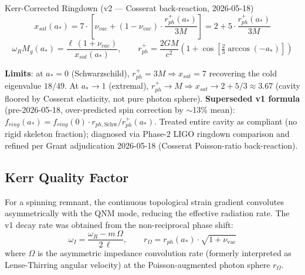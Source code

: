 \begin{resultbox}{Kerr-Corrected Ringdown (v2 --- Cosserat back-reaction, 2026-05-18)}
\begin{equation}
    x_{sat}(a_*) = 7 \cdot \left[\nu_{vac} + (1 - \nu_{vac}) \cdot \frac{r_{ph}^+(a_*)}{3M}\right] = 2 + 5 \cdot \frac{r_{ph}^+(a_*)}{3M}
\end{equation}
\begin{equation}
    \omega_R M_g(a_*) = \frac{\ell\,(1 + \nu_{vac})}{x_{sat}(a_*)}, \qquad
    r_{ph}^+ = \frac{2GM}{c^2}\left(1 + \cos\!\left[\tfrac{2}{3}\arccos(-a_*)\right]\right)
\end{equation}
\end{resultbox}

\noindent\textbf{Limits}: at $a_* = 0$ (Schwarzschild), $r_{ph}^+ = 3M \Rightarrow x_{sat} = 7$ recovering the cold eigenvalue $18/49$. At $a_* \to 1$ (extremal), $r_{ph}^+ \to M \Rightarrow x_{sat} \to 2 + 5/3 \approx 3.67$ (cavity floored by Cosserat elasticity, not pure photon sphere). \textbf{Superseded v1 formula} (pre-2026-05-18, over-predicted spin correction by $\sim$13\% mean): $f_{ring}(a_*) = f_{ring}(0) \cdot r_{ph,\text{Schw}}/r_{ph}^+(a_*)$. Treated entire cavity as compliant (no rigid skeleton fraction); diagnosed via Phase-2 LIGO ringdown comparison and refined per Grant adjudication 2026-05-18 (Cosserat Poisson-ratio back-reaction).

\subsection{Kerr Quality Factor}

For a spinning remnant, the continuous topological strain gradient convolutes asymmetrically with the QNM mode, reducing the effective radiation rate.  The v1 decay rate was obtained from the non-reciprocal phase shift:
\begin{equation}
    \omega_I = \frac{\omega_R - m\,\Omega}{2\,\ell}, \qquad
    r_\Omega = r_{ph}(a_*) \cdot \sqrt{1 + \nu_\mathrm{vac}}
\end{equation}
where $\Omega$ is the asymmetric impedance convolution rate (formerly interpreted as Lense-Thirring angular velocity) at the Poisson-augmented photon sphere $r_\Omega$.

